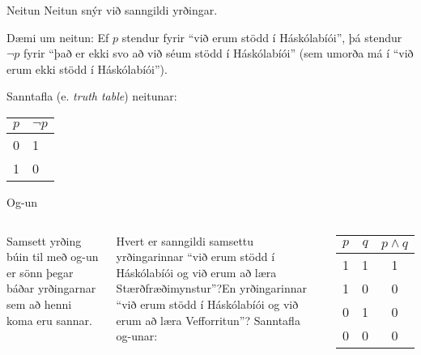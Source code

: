 \documentclass[handout]{beamer}
\begin{document}
\begin{frame}{Neitun}
Neitun snýr við sanngildi yrðingar.
\vspace{0.5cm}

Dæmi um neitun: Ef $p$ stendur fyrir ``við erum stödd í Háskólabíói'', þá stendur $\lnot p$ fyrir\pause{} ``það er ekki svo að við séum stödd í Háskólabíói'' (sem umorða má í ``við erum ekki stödd í Háskólabíói'').

\vspace*{0.5cm}
Sanntafla (e. \emph{truth table}) neitunar:

\begin{center}
\begin{tabular}{ll}
\toprule
$p$&$\lnot p$\\
\midrule
0&1\\
1&0\\
\bottomrule
\end{tabular}
\end{center}
\end{frame}

\begin{frame}{Og-un}
\begin{columns}
Samsett yrðing búin til með og-un er sönn þegar báðar yrðingarnar sem að henni koma eru sannar.

\vspace*{0.5cm}
Hvert er sanngildi samsettu yrðingarinnar ``við erum stödd í Háskólabíói og við erum að læra Stærðfræðimynstur''?\pause En yrðingarinnar ``við erum stödd í Háskólabíói og við erum að læra Vefforritun''?
Sanntafla og-unar:
\begin{center}
\begin{tabular}{ccc}
\toprule
$p$&$q$&$p \land q$ \\
\midrule
1&1&1\\
1&0&0\\
0&1&0\\
0&0&0\\
\bottomrule
\end{tabular}
\end{center}
\end{columns}
\end{frame}
\end{document}
